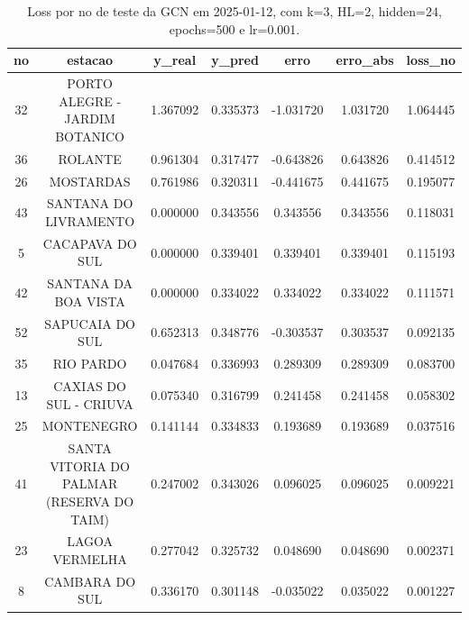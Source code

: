 \begin{table}[h]
\centering
\caption{Loss por no de teste da GCN em 2025-01-12, com k=3, HL=2, hidden=24, epochs=500 e lr=0.001.}
\label{tab:gcn_loss_k3_hl2_h24_e500_d20250112}
\begin{tabular}{ccccccc}
\toprule
no & estacao & y\_real & y\_pred & erro & erro\_abs & loss\_no \\
\midrule
32 & PORTO ALEGRE - JARDIM BOTANICO & 1.367092 & 0.335373 & -1.031720 & 1.031720 & 1.064445 \\
36 & ROLANTE & 0.961304 & 0.317477 & -0.643826 & 0.643826 & 0.414512 \\
26 & MOSTARDAS & 0.761986 & 0.320311 & -0.441675 & 0.441675 & 0.195077 \\
43 & SANTANA DO LIVRAMENTO & 0.000000 & 0.343556 & 0.343556 & 0.343556 & 0.118031 \\
5 & CACAPAVA DO SUL & 0.000000 & 0.339401 & 0.339401 & 0.339401 & 0.115193 \\
42 & SANTANA DA BOA VISTA & 0.000000 & 0.334022 & 0.334022 & 0.334022 & 0.111571 \\
52 & SAPUCAIA DO SUL & 0.652313 & 0.348776 & -0.303537 & 0.303537 & 0.092135 \\
35 & RIO PARDO & 0.047684 & 0.336993 & 0.289309 & 0.289309 & 0.083700 \\
13 & CAXIAS DO SUL - CRIUVA & 0.075340 & 0.316799 & 0.241458 & 0.241458 & 0.058302 \\
25 & MONTENEGRO & 0.141144 & 0.334833 & 0.193689 & 0.193689 & 0.037516 \\
41 & SANTA VITORIA DO PALMAR (RESERVA DO TAIM) & 0.247002 & 0.343026 & 0.096025 & 0.096025 & 0.009221 \\
23 & LAGOA VERMELHA & 0.277042 & 0.325732 & 0.048690 & 0.048690 & 0.002371 \\
8 & CAMBARA DO SUL & 0.336170 & 0.301148 & -0.035022 & 0.035022 & 0.001227 \\
\bottomrule
\end{tabular}
\end{table}
